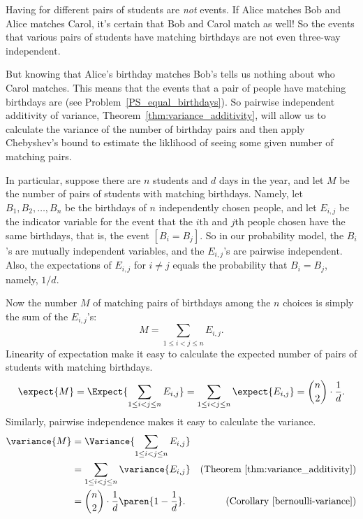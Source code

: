 \iffalse
Unlike the situation with voter preferences,

apply the same reasoning to Birthday Matching as we did for voter
preference.\fi

Having  for different pairs of students are
\emph{not}  events.  If Alice matches Bob
and Alice matches Carol, it's certain that Bob and Carol match as
well!  So the events that various pairs of students have matching
birthdays are not even three-way independent.

But knowing that Alice's birthday matches Bob's tells us nothing about
who Carol matches.  This means that the events that a pair of people
have matching birthdays are  (see
Problem~\ref{PS_equal_birthdays}).  So pairwise independent additivity
of variance, Theorem~\ref{thm:variance_additivity}, will allow us to
calculate the variance of the number of birthday pairs and then apply
Chebyshev's bound to estimate the liklihood of seeing some given
number of matching pairs.

In particular, suppose there are $n$ students and $d$ days in the
year, and let $M$ be the number of pairs of students with matching
birthdays.  Namely, let $B_1,B_2,\dots,B_n$ be the birthdays of $n$
independently chosen people, and let $E_{i,j}$ be the indicator
variable for the event that the $i$th and $j$th people chosen have the
same birthdays, that is, the event $[B_i = B_j]$.  So in our
probability model, the $B_i$'s are mutually independent variables, and
the $E_{i,j}$'s are pairwise independent.  Also, the expectations of
$E_{i,j}$ for $i \neq j$ equals the probability that $B_i = B_j$,
namely, $1/d$.

Now the number $M$ of matching pairs of birthdays among the $n$ choices
is simply the sum of the $E_{i,j}$'s:
\begin{equation}\label{Vn}
M = \sum_{1\le i < j \le n} E_{i,j}.
\end{equation}
Linearity of expectation make it easy to calculate the expected number of
pairs of students with matching birthdays.  \iffalse Then we can take
the same approach as we did in estimating voter preferences to get an
estimate of the probability of getting a number of pairs close to the
expected number.\fi
\[
\expect{M} = \Expect{\sum_{1\le i < j \le n} E_{i,j}} = 
               \sum_{1\le i < j \le n} \expect{E_{i,j}} =
               \binom{n}{2}\cdot \frac{1}{d}.
\]
Similarly, pairwise independence makes it easy to calculate the variance.
\begin{align*}
\variance{M}
   & = \Variance{\sum_{1\le i < j \le n} E_{i,j}}\\
   & = \sum_{1\le i < j \le n} \variance{E_{i,j}}
           & \text{(Theorem~\ref{thm:variance_additivity})}\\
   & = \binom{n}{2} \cdot \frac{1}{d}\paren{1-\frac{1}{d}}.
           & \text{(Corollary~\ref{bernoulli-variance})}
\end{align*} 

